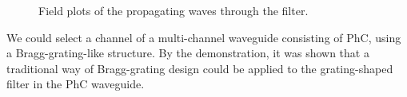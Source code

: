 \begin{figure}[hp!]
  \begin{center}
  \end{center}
  \caption{Field plots of the propagating waves through the filter.}
  \label{fig:sim_filter}
\end{figure}

We could select a channel of a multi-channel waveguide consisting of PhC, using a Bragg-grating-like structure. By the demonstration, it was shown that a traditional way of Bragg-grating design could be applied to the grating-shaped filter in the PhC waveguide.
